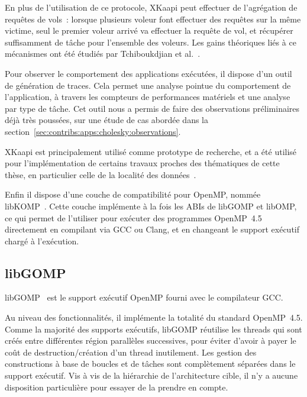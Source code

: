 En plus de l'utilisation de ce protocole, XKaapi peut effectuer de l'agrégation de requêtes de vols~: lorsque plusieurs voleur font effectuer des requêtes sur la même victime, seul le premier voleur arrivé va effectuer la requête de vol, et récupérer suffisamment de tâche pour l'ensemble des voleurs.
Les gains théoriques liés à ce mécanismes ont été étudiés par Tchiboukdjian et al.~\cite{Tchiboukdjian2010a}.

Pour observer le comportement des applications exécutées, il dispose d'un outil de génération de traces.
Cela permet une analyse pointue du comportement de l'application, à travers les compteurs de performances matériels et une analyse par type de tâche.
Cet outil nous a permis de faire des observations préliminaires déjà très poussées, sur une étude de cas abordée dans la section~\ref{sec:contribs:apps:cholesky:observations}.

XKaapi est principalement utilisé comme prototype de recherche, et a été utilisé pour l'implémentation de certains travaux proches des thématiques de cette thèse, en particulier celle de la localité des données~\cite{Durand2013, Bleuse2014, Lima2015}.

Enfin il dispose d'une couche de compatibilité pour OpenMP, nommée libKOMP~\cite{Broquedis2012}.
Cette couche implémente à la fois les ABIs de libGOMP et libOMP, ce qui permet de l'utiliser pour exécuter des programmes OpenMP~4.5 directement en compilant via GCC ou Clang, et en changeant le support exécutif chargé à l'exécution.



\subsection{libGOMP}

libGOMP~\cite{Novillo2006} est le support exécutif OpenMP fourni avec le compilateur GCC.

Au niveau des fonctionnalités, il implémente la totalité du standard OpenMP~4.5.
Comme la majorité des supports exécutifs, libGOMP réutilise les threads qui sont créés entre différentes région parallèles successives, pour éviter d'avoir à payer le coût de destruction/création d'un thread inutilement.
Les gestion des constructions à base de boucles et de tâches sont complètement séparées dans le support exécutif.
Vis à vis de la hiérarchie de l'architecture cible, il n'y a aucune disposition particulière pour essayer de la prendre en compte.

